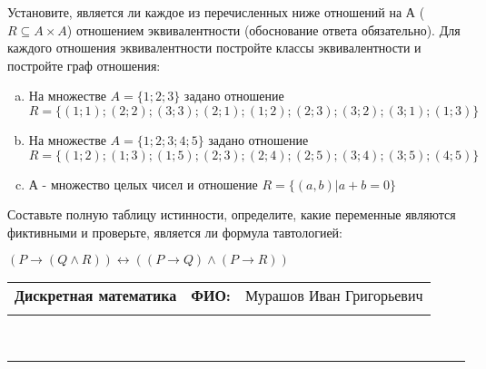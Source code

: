 \documentclass[10pt]{exam}
\newcommand{\class}{Дискретная математика}
\newcommand{\examdate}{}
\begin{document}
\begin{questions}
\question
Установите, является ли каждое из перечисленных ниже отношений на А ($R \subseteq A \times A$) отношением эквивалентности (обоснование ответа обязательно). Для каждого отношения эквивалентности постройте классы 
эквивалентности и постройте граф отношения:
\begin{enumerate} [a)]\setcounter{enumi}{0}
\item На множестве $A = \{1; 2; 3\}$ задано отношение $R = \{(1; 1); (2; 2); (3; 3); (2; 1); (1; 2); (2; 3); (3; 2); (3; 1); (1; 3)\}$
\item На множестве $A = \{1; 2; 3; 4; 5\}$ задано отношение $R = \{(1; 2); (1; 3); (1; 5); (2; 3); (2; 4); (2; 5); (3; 4); (3; 5); (4; 5)\}$
\item А - множество целых чисел и отношение $R = \{(a,b)|a + b = 0\}$
\end{enumerate}\question Составьте полную таблицу истинности, определите, какие переменные являются фиктивными и проверьте, является ли формула тавтологией:

$(P \rightarrow (Q \land R)) \leftrightarrow ((P \rightarrow Q) \land (P \rightarrow R))$

\end{questions}
\newpage
\begin{flushright}
\begin{tabular}{p{2.8in} r l}
\textbf{\class} & \textbf{ФИО:} &Мурашов Иван Григорьевич
\\

\textbf{\examdate} &&\\
\end{tabular}\\
\end{flushright}
\rule[1ex]{\textwidth}{.1pt}
\end{document}
